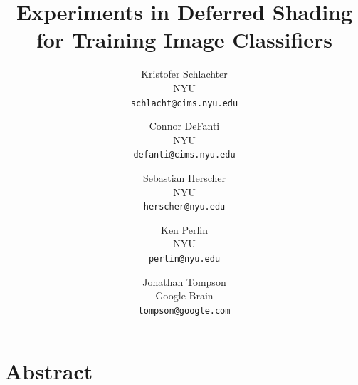 \documentclass[10pt,twocolumn,letterpaper]{article}
\begin{document}
\title{Experiments in Deferred Shading for Training Image Classifiers}

\author{Kristofer Schlachter\\
NYU\\
{\tt\small schlacht@cims.nyu.edu}
\and
Connor DeFanti\\
NYU\\
{\tt\small defanti@cims.nyu.edu}
\and
Sebastian Herscher\\
NYU\\
{\tt\small herscher@nyu.edu}
\and
Ken Perlin\\
NYU\\
{\tt\small perlin@nyu.edu}
\and
Jonathan Tompson\\
Google Brain\\
{\tt\small tompson@google.com}
}

\maketitle
\maketitle

\section{Abstract}
\end{document}

